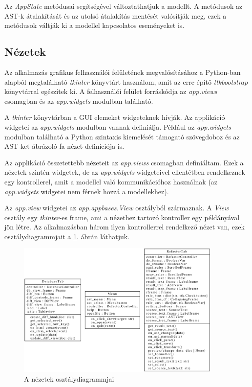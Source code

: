 Az \emph{AppState} metódusai segítségével változtathatjuk a modellt.
A metódusok az AST-k átalakítását és az utolsó átalakítás mentését valósítják meg,
ezek a metódusok váltják ki a modellel kapcsolatos eseményeket is.

\subsection{Nézetek}

Az alkalmazás grafikus felhasználói felületének megvalósításához
a Python-ban alapból megtalálható
\emph{tkinter} könyvtárt használom, amit az erre építő \emph{ttkbootstrap} könyvtárral
egészítek ki.
A felhasználói felület forráskódja az \emph{app.views} csomagban és az \emph{app.widgets}
modulban található.

A \emph{tkinter} könyvtárban a GUI elemeket widgeteknek hívják.
Az applikáció widgetei az \emph{app.widgets} modulban vannak definiálja.
Például az \emph{app.widgets} modulban található
a Python szintaxis kiemelését támogató szövegdoboz
és az AST-ket ábrázoló fa-nézet definíciója is.

Az applikáció összetettebb nézeteit az \emph{app.views} csomagban definiáltam.
Ezek a nézetek szintén widgetek,
de az \emph{app.widgets} widgeteivel ellentétben
rendelkeznek egy kontrollerel,
amit a modellel való kommunikációhoz használnak
(az \emph{app.widgets} widgetei nem férnek hozzá a modellekhez).

Az \emph{app.view} widgetei az \emph{app.appbases.View} osztályból származnak.
A \emph{View} osztály egy \emph{tkinter}-es frame, ami
a nézethez tartozó kontroller egy példányával jön létre.
Az alkalmazásban három ilyen kontrollerrel rendelkező nézet van,
ezek osztálydiagrammjait a \ref{fig:views}. ábrán láthatjuk.

\begin{figure}[H]
	\centering
	\includegraphics[width=0.9\textwidth]{images/uml/views.eps}
	\caption{\label{fig:views}A nézetek osztálydiagrammjai}
\end{figure}

